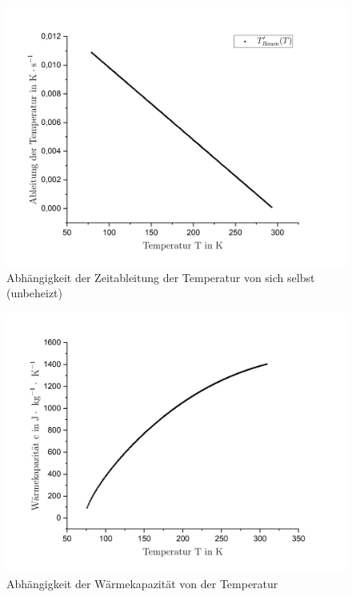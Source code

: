 \documentclass{include/protokollclass}
\begin{document}
\begin{figure}[H]
    \centering
    \includegraphics[scale=0.5]{fig/A2T'T1.png}
    \caption{Abhängigkeit der Zeitableitung der Temperatur von sich selbst \\ (unbeheizt)}
    \label{fig:t2}
\end{figure}
\begin{figure}[H]
    \centering
    \includegraphics[scale=0.5]{fig/A2cT.png}
    \caption{Abhängigkeit der Wärmekapazität von der Temperatur}
    \label{fig:c}
\end{figure}
\clearpage
\end{document}
